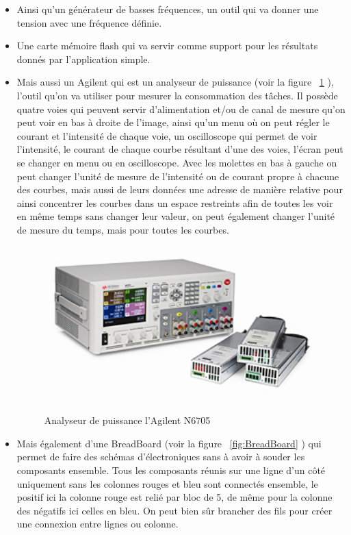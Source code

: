 \documentclass[a4paper]{article}
\begin{document}
\begin{itemize}
\item Ainsi qu'un générateur de basses fréquences, un outil qui va donner une tension avec une fréquence définie.

\item Une carte mémoire flash qui va servir comme support pour les résultats donnés par l'application simple.

\item Mais aussi un Agilent qui est un analyseur de puissance (voir la figure ~\ref{fig:Agilent} ), l'outil qu'on va utiliser pour mesurer la consommation des tâches. Il possède quatre voies qui peuvent servir d'alimentation et/ou de canal de mesure qu'on peut voir en bas à droite de l'image, ainsi qu'un menu où on peut régler le courant et l'intensité de chaque voie, un oscilloscope qui permet de voir l'intensité, le courant de chaque courbe résultant d'une des voies, l'écran peut se changer en menu ou en oscilloscope. Avec les molettes en bas à gauche on peut changer l'unité de mesure de l'intensité ou de courant propre à chacune des courbes, mais aussi de leurs données une adresse de manière relative pour ainsi concentrer les courbes dans un espace restreints afin de toutes les voir en même temps sans changer leur valeur, on peut également changer l'unité de mesure du temps, mais pour toutes les courbes. 

\begin{figure}[!ht]
\centering
\includegraphics[width=1\textwidth]{N6705A_4_2007Mar5-300x180.jpg}
\caption{\label{fig:Agilent}Analyseur de puissance l'Agilent N6705}
\end{figure}

\item Mais également d'une BreadBoard (voir la figure ~\ref{fig:BreadBoard} ) qui permet de faire des schémas d'électroniques sans à avoir à souder les composants ensemble. Tous les composants réunis sur une ligne d'un côté uniquement sans les colonnes rouges et bleu sont connectés ensemble, le positif ici la colonne rouge est relié par bloc de 5, de même pour la colonne des négatifs ici celles en bleu. On peut bien sûr brancher des fils pour créer une connexion entre lignes ou colonne.  


\end{itemize}
\end{document}
